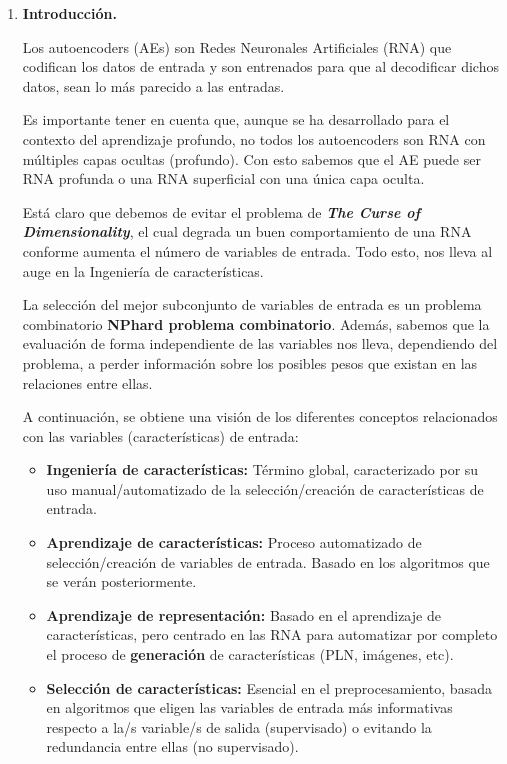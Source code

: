 \begin{enumerate}
    \item \textbf{Introducción.} 
    \par Los autoencoders (AEs) son Redes Neuronales Artificiales (RNA) que codifican los datos de entrada y son entrenados para que al decodificar dichos datos, sean lo más parecido a las entradas.
    
    Es importante tener en cuenta que, aunque se ha desarrollado para el contexto del aprendizaje profundo, no todos los autoencoders son RNA con múltiples capas ocultas (profundo). Con esto sabemos que el AE puede ser RNA profunda o una RNA superficial con una única capa oculta.
    
    Está claro que debemos de evitar el problema de \textbf{\textit {The Curse of Dimensionality}}, el cual degrada un buen comportamiento de una RNA conforme aumenta el número de variables de entrada. Todo esto, nos lleva al auge en la Ingeniería de características.
    
    La selección del mejor subconjunto de variables de entrada es un problema combinatorio \textbf{NPhard problema combinatorio}. Además, sabemos que la evaluación de forma independiente de las variables nos lleva, dependiendo del problema, a perder información sobre los posibles pesos que existan en las relaciones entre ellas.
    
    A continuación, se obtiene una visión de los diferentes conceptos relacionados con las variables (características) de entrada:
    
    \begin{itemize}
        \item \textbf{Ingeniería de características:} Término global, caracterizado por su uso manual/automatizado de la selección/creación de características de entrada.
        
        \item \textbf{Aprendizaje de características:} Proceso automatizado de selección/creación de variables de entrada. Basado en los algoritmos que se verán posteriormente.
        
        \item \textbf{Aprendizaje de representación:} Basado en el aprendizaje de características, pero centrado en las RNA para automatizar por completo el proceso de \textbf{generación} de características (PLN, imágenes, etc). 
        
        \item \textbf{Selección de características:} Esencial en el preprocesamiento, basada en algoritmos que eligen las variables de entrada más informativas respecto a la/s variable/s de salida (supervisado) o evitando la redundancia entre ellas (no supervisado).
        

\end{itemize}
\end{enumerate}
